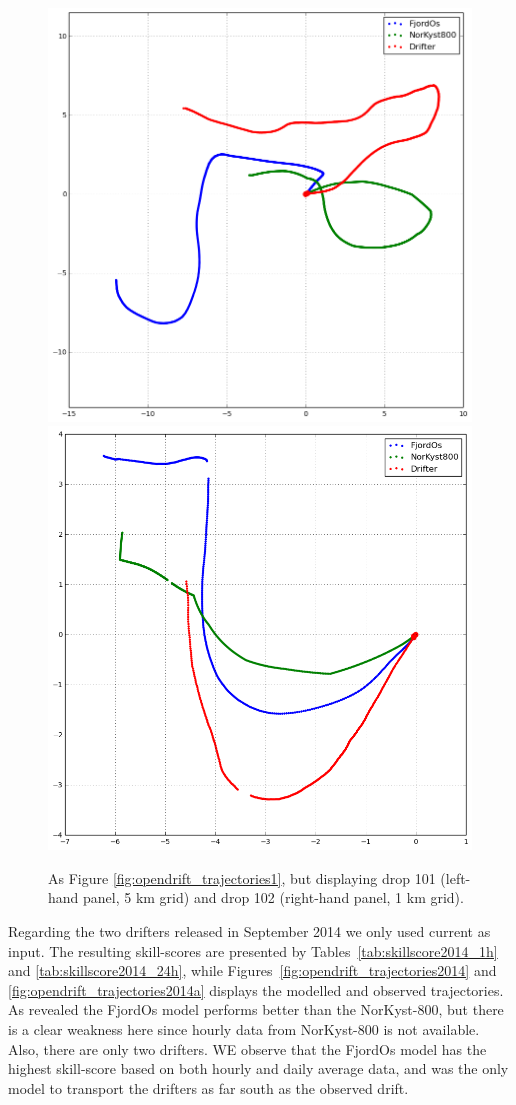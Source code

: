 \begin{figure}[htb]
	\centerline{
		\includegraphics*[width=.5\textwidth]{Figurer/opendrift/skillscore/drop101i6}
		\includegraphics*[width=.5\textwidth]{Figurer/opendrift/skillscore/drop102i9}
		}
	\caption{\small As Figure \ref{fig:opendrift_trajectories1}, but displaying drop 101 (left-hand panel, 5 km grid) and drop 102 (right-hand panel, 1 km grid).}
	\label{fig:opendrift_trajectories3}
\end{figure}

Regarding the two drifters released in September 2014 we only used current as input. The resulting skill-scores are presented by Tables~\ref{tab:skillscore2014_1h} and \ref{tab:skillscore2014_24h}, while Figures~\ref{fig:opendrift_trajectories2014} and \ref{fig:opendrift_trajectories2014a} displays the modelled and observed trajectories. As revealed the FjordOs model performs better than the NorKyst-800, but there is a clear weakness here since hourly data from NorKyst-800 is not available. Also, there are only two drifters. WE observe that the FjordOs model has the highest skill-score based on both hourly and daily average data, and was the only model to transport the drifters as far south as the observed drift. 

